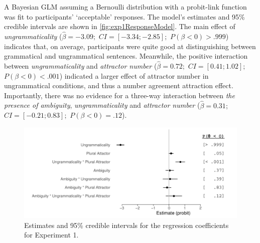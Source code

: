 \documentclass[doc,a4paper,man,natbib,floatsintext,noextraspace]{apa6}\usepackage[]{graphicx}\usepackage[]{color}
\makeatletter
\def\maxwidth{ %
  \ifdim\Gin@nat@width>\linewidth
    \linewidth
  \else
    \Gin@nat@width
  \fi
}
\newenvironment{knitrout}{}{} %
\makeatother
\begin{document}
A Bayesian GLM assuming a Bernoulli distribution with a probit-link function was fit to participants' `acceptable' responses. The model's estimates and 95\% credible intervals are shown in \autoref{fig:exp1ResponseModel}. 
%
%
The main effect of \textit{ungrammaticality} ($\hat{\beta}=-3.09;$ $CI=[-3.34; -2.85];$ $P(\beta<0)> .999$) indicates that, on average, participants were quite good at distinguishing between grammatical and ungrammatical sentences. Meanwhile, the positive interaction between \textit{ungrammaticality} and \textit{attractor number} ($\hat{\beta}=0.72;$ $CI=[0.41; 1.02];$ $P(\beta<0)< .001$) indicated a larger effect of attractor number in ungrammatical conditions, and thus a number agreement attraction effect.
Importantly, there was no evidence for a three-way interaction between \textit{the presence of ambiguity}, \textit{ungrammaticality} and \textit{attractor number} ($\hat{\beta}=0.31;$ $CI=[-0.21; 0.83];$ $P(\beta<0)=    .12$).




\begin{knitrout}
\color{fgcolor}\begin{figure}

{\centering \includegraphics[width=\maxwidth]{figure/exp1ResponseModel-1} 

}

\caption[Estimates and 95\% credible intervals for the regression coefficients for Experiment 1]{Estimates and 95\% credible intervals for the regression coefficients for Experiment 1.}\label{fig:exp1ResponseModel}
\end{figure}


\end{knitrout}
\end{document}
